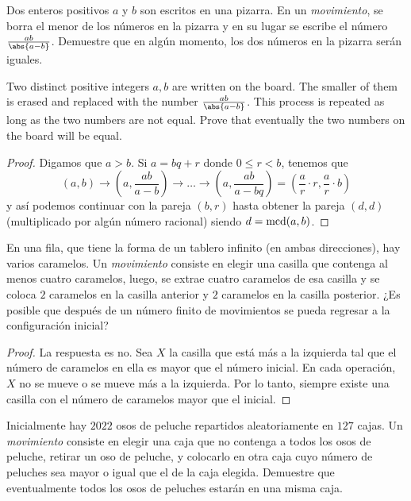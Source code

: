 
\begin{probEG}
  Dos enteros positivos $a$ y $b$ son escritos en una pizarra. En un
  \emph{movimiento}, se borra el menor de los números en la pizarra y en su
  lugar se escribe el número $\frac{ab}{\abs{a-b}}$. Demuestre que en algún
  momento, los dos números en la pizarra serán iguales.
  \begin{hint}
    Two distinct positive integers $a,b$ are written on the board. The smaller
    of them is erased and replaced with the number $\frac{ab}{\abs{a-b}}$. This
    process is repeated as long as the two numbers are not equal. Prove that
    eventually the two numbers on the board will be equal.
  \end{hint}
\end{probEG}

\begin{proof}
  Digamos que $a>b$. Si $a=bq+r$ donde $0\le r<b$, tenemos que
  \[
    (a,b)\to\left(a,\frac{ab}{a-b}\right)\to\dots\to\left(a,\frac{ab}{a-bq}\right)
    =\left(\frac{a}{r}\cdot r,\frac{a}{r}\cdot b\right)
  \]
  y así podemos continuar con la pareja $(b,r)$ hasta obtener la pareja $(d,d)$
  (multiplicado por algún número racional) siendo $d=\operatorname{mcd}(a,b)$.
\end{proof}

\begin{probEG}
  En una fila, que tiene la forma de un tablero infinito (en ambas direcciones),
  hay varios caramelos. Un \emph{movimiento} consiste en elegir una casilla que
  contenga al menos cuatro caramelos, luego, se extrae cuatro caramelos de esa
  casilla y se coloca $2$ caramelos en la casilla anterior y $2$ caramelos en la
  casilla posterior. ¿Es posible que después de un número finito de movimientos
  se pueda regresar a la configuración inicial?
\end{probEG}

\begin{proof}
  La respuesta es no. Sea $X$ la casilla que está más a la izquierda tal que el
  número de caramelos en ella es mayor que el número inicial. En cada operación,
  $X$ no se mueve o se mueve más a la izquierda. Por lo tanto, siempre existe
  una casilla con el número de caramelos mayor que el inicial.
\end{proof}

\begin{probEG}
  Inicialmente hay $2022$ osos de peluche repartidos aleatoriamente en $127$
  cajas. Un \emph{movimiento} consiste en elegir una caja que no contenga a
  todos los osos de peluche, retirar un oso de peluche, y colocarlo en otra caja
  cuyo número de peluches sea mayor o igual que el de la caja elegida. Demuestre
  que eventualmente todos los osos de peluches estarán en una misma caja.
\end{probEG}


